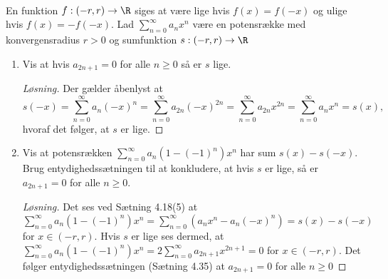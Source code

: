 	\begin{opg}\hfill \\
		En funktion $ f:(-r,r)\to \R $ siges at være lige hvis $ f(x)=f(-x) $ og ulige hvis $ f(x)=-f(-x) $. Lad $ \sum_{n=0}^{\infty}a_nx^n $ være en potensrække med konvergensradius $ r>0 $ og sumfunktion $ s:(-r,r)\to \R $
		\begin{enumerate}
			\item Vis at hvis $ a_{2n+1}=0 $ for alle $ n\geq 0 $ så er $ s $ lige.
			\ifanswers
			\begin{proof}[Løsning]
				Der gælder åbenlyst at $$ s(-x)=\sum_{n=0}^{\infty}a_n(-x)^n=\sum_{n=0}^{\infty}a_{2n}(-x)^{2n}=\sum_{n=0}^{\infty}a_{2n}x^{2n}=\sum_{n=0}^{\infty}a_nx^n=s(x), $$
				hvoraf det følger, at $ s $ er lige.
			\end{proof}
			\fi
			\item Vis at potensrækken $ \sum_{n=0}^{\infty}a_n(1-(-1)^n)x^n $ har sum $ s(x)-s(-x) $. Brug entydighedssætningen til at konkludere, at hvis $ s $ er lige, så er $ a_{2n+1}=0 $ for alle $ n\geq 0 $.
			\ifanswers
			\begin{proof}[Løsning]
				Det ses ved Sætning 4.18(5) at $  \sum_{n=0}^{\infty}a_n(1-(-1)^n)x^n= \sum_{n=0}^{\infty}(a_nx^n-a_n(-x)^n)=s(x)-s(-x) $ for $ x\in(-r,r) $. Hvis $ s $ er lige ses dermed, at $ \sum_{n=0}^{\infty}a_n(1-(-1)^n)x^n=2\sum_{n=0}^{\infty}a_{2n+1}x^{2n+1}=0 $ for $ x\in(-r,r) $. Det følger entydighedssætningen (Sætning 4.35) at $ a_{2n+1}=0 $ for alle $ n\geq 0 $
			\end{proof}
			\fi
		\end{enumerate}
		
	\end{opg}